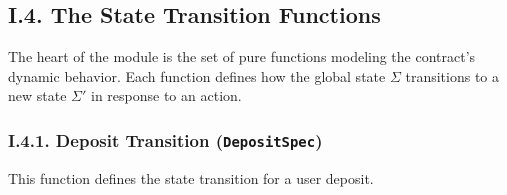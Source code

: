 \documentclass[
  english,
  onecolumn]{article}
\begin{document}
\subsection{I.4. The State Transition
Functions}\label{i.4.-the-state-transition-functions}

The heart of the module is the set of pure functions modeling the
contract's dynamic behavior. Each function defines how the global state
\(\Sigma\) transitions to a new state \(\Sigma'\) in response to an
action.

\subsubsection{\texorpdfstring{I.4.1. Deposit Transition
(\texttt{DepositSpec})}{I.4.1. Deposit Transition (DepositSpec)}}\label{i.4.1.-deposit-transition-depositspec}

This function defines the state transition for a user deposit.
\end{document}

